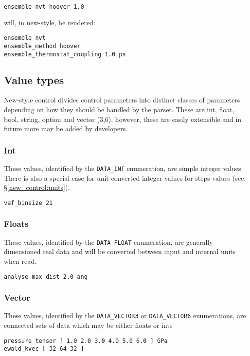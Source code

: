 \begin{verbatim}
ensemble nvt hoover 1.0
\end{verbatim}

will, in new-style, be rendered:

\begin{verbatim}
ensemble nvt
ensemble_method hoover
ensemble_thermostat_coupling 1.0 ps
\end{verbatim}

\subsection{Value types}
New-style control divides control parameters into distinct classes of parameters depending on how they should be handled by the parser. These are int, float, bool, string, option and vector (3,6), however, these are easily extensible and in future more may be added by developers.
\subsubsection{Int}
These values, identified by the \verb#DATA_INT# enumeration, are simple integer values. There is also a special case for unit-converted integer values for steps values (see: \S\ref{new_control:units}).

\begin{verbatim}
vaf_binsize 21
\end{verbatim}

\subsubsection{Floats}
These values, identified by the \verb#DATA_FLOAT# enumeration, are generally dimensioned real data and will be converted between input and internal units when read.

\begin{verbatim}
analyse_max_dist 2.0 ang
\end{verbatim}

\subsubsection{Vector}
These values, identified by the \verb#DATA_VECTOR3# or \verb#DATA_VECTOR6# enumerations, are connected sets of data which may be either floats or ints

\begin{verbatim}
pressure_tensor [ 1.0 2.0 3.0 4.0 5.0 6.0 ] GPa
ewald_kvec [ 32 64 32 ]
\end{verbatim}

